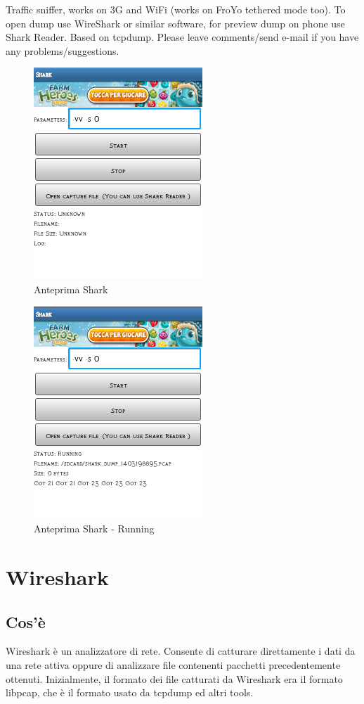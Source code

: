 \documentclass[a4paper,11pt]{book}
\begin{document}
Traffic sniffer, works on 3G and WiFi (works on FroYo tethered mode too).
To open dump use WireShark or similar software, for preview dump on phone use Shark Reader.
Based on tcpdump. Please leave comments/send e-mail if you have any problems/suggestions.


\begin{figure}[h!t]
\centering
\includegraphics[scale = 0.6]{shark}
\caption{Anteprima Shark}
\end{figure}

\begin{figure}[h!t]
\centering
\includegraphics[scale = 0.6]{shark_go}
\caption{Anteprima Shark - Running}
\end{figure}

\clearpage

\section{Wireshark}

\subsection{Cos'\`e}
Wireshark \`e un analizzatore di rete. Consente di catturare direttamente i dati da una rete attiva oppure di analizzare file contenenti pacchetti precedentemente ottenuti. Inizialmente, il formato dei file catturati da Wireshark era il formato libpcap, che \`e il formato usato da tcpdump ed altri tools.
\end{document}

